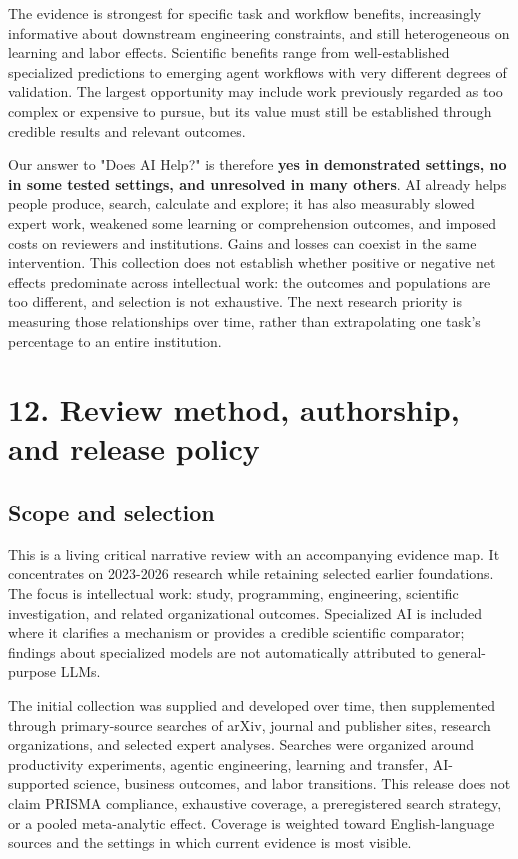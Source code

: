 The evidence is strongest for specific task and workflow benefits, increasingly informative about downstream engineering constraints, and still heterogeneous on learning and labor effects. Scientific benefits range from well-established specialized predictions to emerging agent workflows with very different degrees of validation. The largest opportunity may include work previously regarded as too complex or expensive to pursue, but its value must still be established through credible results and relevant outcomes.


Our answer to "Does AI Help?" is therefore \textbf{yes in demonstrated settings, no in some tested settings, and unresolved in many others}. AI already helps people produce, search, calculate and explore; it has also measurably slowed expert work, weakened some learning or comprehension outcomes, and imposed costs on reviewers and institutions. Gains and losses can coexist in the same intervention. This collection does not establish whether positive or negative net effects predominate across intellectual work: the outcomes and populations are too different, and selection is not exhaustive. The next research priority is measuring those relationships over time, rather than extrapolating one task's percentage to an entire institution.



\section*{12. Review method, authorship, and release policy}

\subsection*{Scope and selection}
This is a living critical narrative review with an accompanying evidence map. It concentrates on 2023-2026 research while retaining selected earlier foundations. The focus is intellectual work: study, programming, engineering, scientific investigation, and related organizational outcomes. Specialized AI is included where it clarifies a mechanism or provides a credible scientific comparator; findings about specialized models are not automatically attributed to general-purpose LLMs.


The initial collection was supplied and developed over time, then supplemented through primary-source searches of arXiv, journal and publisher sites, research organizations, and selected expert analyses. Searches were organized around productivity experiments, agentic engineering, learning and transfer, AI-supported science, business outcomes, and labor transitions. This release does not claim PRISMA compliance, exhaustive coverage, a preregistered search strategy, or a pooled meta-analytic effect. Coverage is weighted toward English-language sources and the settings in which current evidence is most visible.



